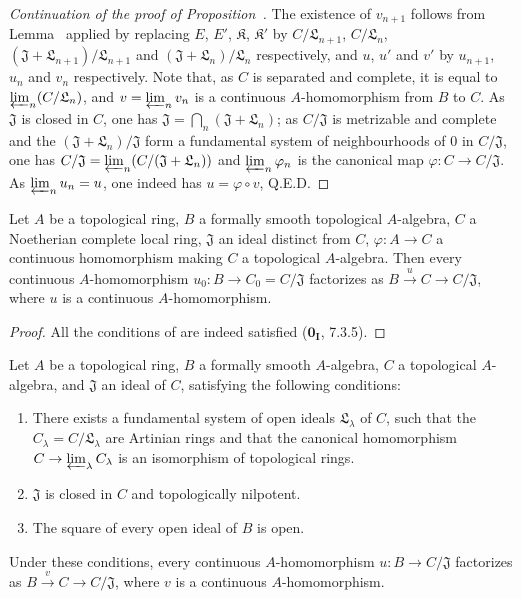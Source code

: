 \begin{proof}[Continuation of the proof of Proposition~{\rm{}}]
The existence of $v_{n+1}$ follows from Lemma~ applied by replacing $E$, $E'$, $\mathfrak K$, $\mathfrak K'$ by $C/\mathfrak L_{n+1}$, $C/\mathfrak L_n$, $(\mathfrak{J}+\mathfrak L_{n+1})/\mathfrak L_{n+1}$ and $(\mathfrak{J}+\mathfrak L_n)/\mathfrak L_n$ respectively, and $u$, $u'$ and $v'$ by $u_{n+1}$, $u_n$ and $v_n$ respectively.
Note that, as $C$ is separated and complete, it is equal to $\varprojlim_n(C/\mathfrak L_n)$, and $v=\varprojlim_n v_n$ is a continuous $A$-homomorphism from $B$ to $C$.
As $\mathfrak{J}$ is closed in $C$, one has $\mathfrak{J}=\bigcap_n(\mathfrak{J}+\mathfrak L_n)$;
as $C/\mathfrak{J}$ is metrizable and complete and the $(\mathfrak{J}+\mathfrak L_n)/\mathfrak{J}$ form a fundamental system of neighbourhoods of $0$ in $C/\mathfrak{J}$, one has $C/\mathfrak{J}=\varprojlim_n(C/(\mathfrak{J}+\mathfrak L_n))$ and $\varprojlim_n\varphi_n$ is the canonical map $\varphi:C\to C/\mathfrak{J}$.
As $\varprojlim_n u_n=u$, one indeed has $u=\varphi\circ v$, Q.E.D.
\end{proof}

\begin{corollary}[19.3.11]
\label{0.19.3.11}
Let $A$ be a topological ring, $B$ a formally smooth topological $A$-algebra, $C$ a Noetherian complete local ring, $\mathfrak{J}$ an ideal distinct from $C$, $\varphi:A\to C$ a continuous homomorphism making $C$ a topological $A$-algebra.
Then every continuous $A$-homomorphism $u_0:B\to C_0=C/\mathfrak{J}$ factorizes as $B\xrightarrow{u}C\to C/\mathfrak{J}$, where $u$ is a continuous $A$-homomorphism.
\end{corollary}

\begin{proof}
All the conditions of  are indeed satisfied ($\mathbf{0_I}$, 7.3.5).
\end{proof}

\begin{proposition}[19.3.12]
\label{0.19.3.12}
Let $A$ be a topological ring, $B$ a formally smooth $A$-algebra, $C$ a topological $A$-algebra, and $\mathfrak{J}$ an ideal of $C$, satisfying the following conditions:
\begin{enumerate}
  \item[$1^\circ$] There exists a fundamental system of open ideals $\mathfrak L_\lambda$ of $C$, such that the $C_\lambda=C/\mathfrak L_\lambda$ are Artinian rings and that the canonical homomorphism $C\to\varprojlim_\lambda C_\lambda$ is an isomorphism of topological rings.
  \item[$2^\circ$] $\mathfrak{J}$ is closed in $C$ and topologically nilpotent.
  \item[$3^\circ$] The square of every open ideal of $B$ is open.
\end{enumerate}
Under these conditions, every continuous $A$-homomorphism $u:B\to C/\mathfrak{J}$ factorizes as $B\xrightarrow{v}C\to C/\mathfrak{J}$, where $v$ is a continuous $A$-homomorphism.
\end{proposition}

